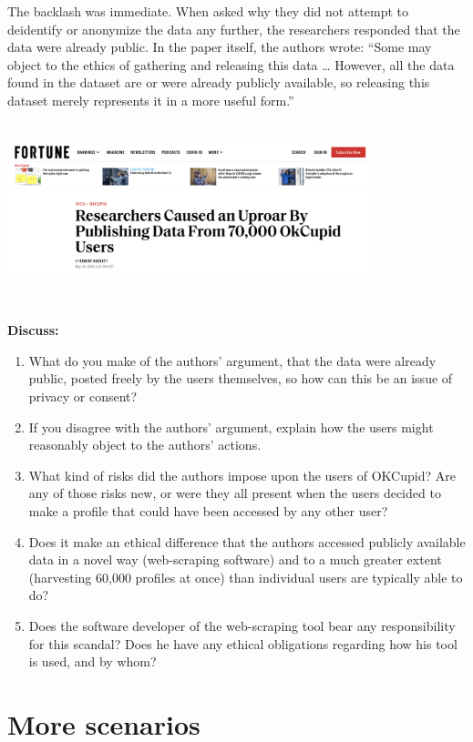 \documentclass[
]{book}
\begin{document}
The backlash was immediate. When asked why they did not attempt to deidentify or anonymize the data any further, the researchers responded that the data were already public. In the paper itself, the authors wrote: ``Some may object to the ethics of gathering and releasing this data \ldots{} However, all the data found in the dataset are or were already publicly available, so releasing this dataset merely represents it in a more useful form.''

~\\

\includegraphics[width=0.8\textwidth,height=\textheight]{img/ethics-okcupid.png}

~

\textbf{Discuss:}

\begin{enumerate}
\def\labelenumi{\arabic{enumi}.}
\item
  What do you make of the authors' argument, that the data were already public, posted freely by the users themselves, so how can this be an issue of privacy or consent?
\item
  If you disagree with the authors' argument, explain how the users might reasonably object to the authors' actions.
\item
  What kind of risks did the authors impose upon the users of OKCupid? Are any of those risks new, or were they all present when the users decided to make a profile that could have been accessed by any other user?
\item
  Does it make an ethical difference that the authors accessed publicly available data in a novel way (web-scraping software) and to a much greater extent (harvesting 60,000 profiles at once) than individual users are typically able to do?
\item
  Does the software developer of the web-scraping tool bear any responsibility for this scandal? Does he have any ethical obligations regarding how his tool is used, and by whom?
\end{enumerate}

\hypertarget{more-scenarios}{%
\section*{More scenarios}\label{more-scenarios}}
\end{document}
